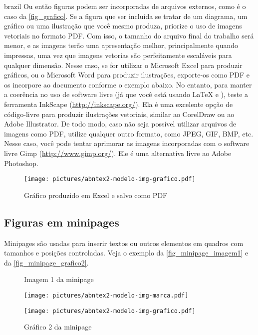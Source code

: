 \begin{otherlanguage*}{brazil}
Ou então figuras podem ser incorporadas de arquivos externos, como é o caso da
\autoref{fig_grafico}. Se a figura que ser incluída se tratar de um diagrama, um
gráfico ou uma ilustração que você mesmo produza, priorize o uso de imagens
vetoriais no formato PDF. Com isso, o tamanho do arquivo final do trabalho será
menor, e as imagens terão uma apresentação melhor, principalmente quando
impressas, uma vez que imagens vetorias são perfeitamente escaláveis para
qualquer dimensão. Nesse caso, se for utilizar o Microsoft Excel para produzir
gráficos, ou o Microsoft Word para produzir ilustrações, exporte-os como PDF e
os incorpore ao documento conforme o exemplo abaixo. No entanto, para manter a
coerência no uso de software livre (já que você está usando \LaTeX{} e \abnTeX{}),
teste a ferramenta \textsf{InkScape}
(\url{http://inkscape.org/}). Ela é uma excelente opção de código-livre para
produzir ilustrações vetoriais, similar ao CorelDraw ou ao Adobe
Illustrator. De todo modo, caso não seja possível
utilizar arquivos de imagens como PDF, utilize qualquer outro formato, como
JPEG, GIF, BMP, etc. Nesse caso, você pode tentar aprimorar as imagens
incorporadas com o software livre \textsf{Gimp}
(\url{http://www.gimp.org/}). Ele é uma alternativa livre ao Adobe
Photoshop.

\begin{figure}[htb]
    \caption{\label{fig_grafico}Gráfico produzido em Excel e salvo como PDF}
    \begin{center}
        \texttt{[image: pictures/abntex2-modelo-img-grafico.pdf]}
    \end{center}
\end{figure}

\subsection{Figuras em minipages}

Minipages são usadas para inserir textos ou outros elementos em quadros
com tamanhos e posições controladas. Veja o exemplo da
\autoref{fig_minipage_imagem1} e da \autoref{fig_minipage_grafico2}.

\begin{figure}[htb]
\label{teste}
\centering
 \begin{minipage}{0.49\textwidth}
   \centering
   \caption{Imagem 1 da minipage} \label{fig_minipage_imagem1}
   \texttt{[image: pictures/abntex2-modelo-img-marca.pdf]}
 \end{minipage}
 \hfill
 \begin{minipage}{0.49\textwidth}
   \centering
   \caption{Gráfico 2 da minipage} \label{fig_minipage_grafico2}
   \texttt{[image: pictures/abntex2-modelo-img-grafico.pdf]}
 \end{minipage}
\end{figure}




\end{otherlanguage*}
